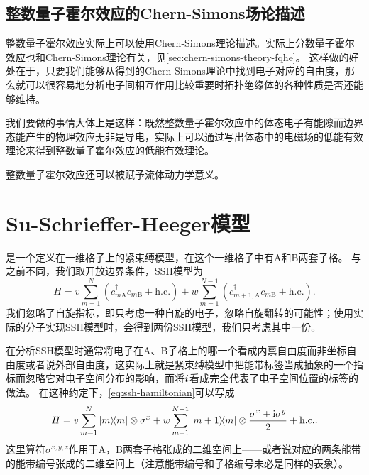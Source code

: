 \subsection{整数量子霍尔效应的Chern-Simons场论描述}

整数量子霍尔效应实际上可以使用Chern-Simons理论描述\cite{topological_insulator_concepts}。实际上分数量子霍尔效应也和Chern-Simons理论有关，见\autoref{sec:chern-simons-theory-fqhe}。
这样做的好处在于，只要我们能够从得到的Chern-Simons理论中找到电子对应的自由度，那么就可以很容易地分析电子间相互作用比较重要时拓扑绝缘体的各种性质是否还能够维持。

我们要做的事情大体上是这样：既然整数量子霍尔效应中的体态电子有能隙而边界态能产生的物理效应无非是导电，实际上可以通过写出体态中的电磁场的低能有效理论来得到整数量子霍尔效应的低能有效理论。

整数量子霍尔效应还可以被赋予流体动力学意义\cite{Chan_2016}。

\section{Su-Schrieffer-Heeger模型}

是一个定义在一维格子上的紧束缚模型，在这个一维格子中有A和B两套子格\cite{Asb_th_2016}。
与之前不同，我们取开放边界条件，SSH模型为
\begin{equation}
    H = v \sum_{m=1}^N (c^\dagger_{m \text{A}} c_{m \text{B}} + \text{h.c.}) + w \sum_{m=1}^{N-1} (c^\dagger_{m+1, \text{A}} c_{m \text{B}} +  \text{h.c.}).
    \label{eq:ssh-hamiltonian}
\end{equation}
我们忽略了自旋指标，即只考虑一种自旋的电子，忽略自旋翻转的可能性；使用实际的分子实现SSH模型时，会得到两份SSH模型，我们只考虑其中一份。

在分析SSH模型时通常将电子在A、B子格上的哪一个看成内禀自由度而非坐标自由度或者说外部自由度，这实际上就是紧束缚模型中把能带标签当成抽象的一个指标而忽略它对电子空间分布的影响，而将$\vb*{i}$看成完全代表了电子空间位置的标签的做法。
在这种约定下，\eqref{eq:ssh-hamiltonian}可以写成
\begin{equation}
    H = v \sum_{m=1}^N \dyad{m} \otimes \sigma^x + w \sum_{m=1}^{N-1} \dyad{m+1}{m} \otimes \frac{\sigma^x + \ii \sigma^y}{2} + \text{h.c.}. 
    \label{eq:ssh-pseudospin-hamiltonian}
\end{equation}
这里算符$\sigma^{x, y, z}$作用于A，B两套子格张成的二维空间上——或者说对应的两条能带的能带编号张成的二维空间上（注意能带编号和子格编号未必是同样的表象）。


